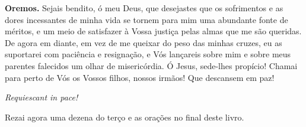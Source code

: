 \vspace{\baselineskip}\noindent \textbf{Oremos.} Sejais bendito, ó meu Deus, que desejastes que os sofrimentos e as dores incessantes de minha vida se tornem para mim uma abundante fonte de méritos, e um meio de satisfazer à Vossa justiça pelas almas que me são queridas. De agora em diante, em vez de me queixar do peso das minhas cruzes, eu as suportarei com paciência e resignação, e Vós lançareis sobre mim e sobre meus parentes falecidos um olhar de misericórdia. Ó Jesus, sede-lhes propício! Chamai para perto de Vós os Vossos filhos, nossos irmãos! Que descansem em paz!



\begin{center}
\textit{Requiescant in pace!}
\end{center}

Rezai agora uma dezena do terço e as orações no final deste livro.
